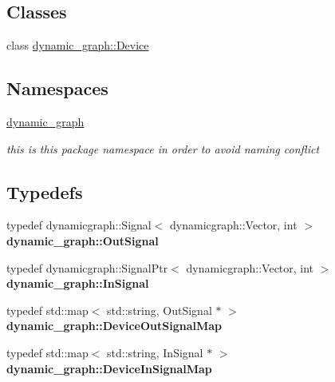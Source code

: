 \subsection*{Classes}
\begin{DoxyCompactItemize}
\item 
class \hyperlink{classdynamic__graph_1_1Device}{dynamic\+\_\+graph\+::\+Device}
\end{DoxyCompactItemize}
\subsection*{Namespaces}
\begin{DoxyCompactItemize}
\item 
 \hyperlink{namespacedynamic__graph}{dynamic\+\_\+graph}
\begin{DoxyCompactList}\small\item\em this is this package namespace in order to avoid naming conflict \end{DoxyCompactList}\end{DoxyCompactItemize}
\subsection*{Typedefs}
\begin{DoxyCompactItemize}
\item 
typedef dynamicgraph\+::\+Signal$<$ dynamicgraph\+::\+Vector, int $>$ {\bfseries dynamic\+\_\+graph\+::\+Out\+Signal}\hypertarget{namespacedynamic__graph_a6c34573645d04590fd934e56f3d1b16b}{}\label{namespacedynamic__graph_a6c34573645d04590fd934e56f3d1b16b}

\item 
typedef dynamicgraph\+::\+Signal\+Ptr$<$ dynamicgraph\+::\+Vector, int $>$ {\bfseries dynamic\+\_\+graph\+::\+In\+Signal}\hypertarget{namespacedynamic__graph_a5a0e93b7f753ed4c9869e83a04c30d74}{}\label{namespacedynamic__graph_a5a0e93b7f753ed4c9869e83a04c30d74}

\item 
typedef std\+::map$<$ std\+::string, Out\+Signal $\ast$ $>$ {\bfseries dynamic\+\_\+graph\+::\+Device\+Out\+Signal\+Map}\hypertarget{namespacedynamic__graph_a4769898c82f6e8bef38422819cca0481}{}\label{namespacedynamic__graph_a4769898c82f6e8bef38422819cca0481}

\item 
typedef std\+::map$<$ std\+::string, In\+Signal $\ast$ $>$ {\bfseries dynamic\+\_\+graph\+::\+Device\+In\+Signal\+Map}\hypertarget{namespacedynamic__graph_a7deb814159c6992434f2660870726c73}{}\label{namespacedynamic__graph_a7deb814159c6992434f2660870726c73}

\end{DoxyCompactItemize}


